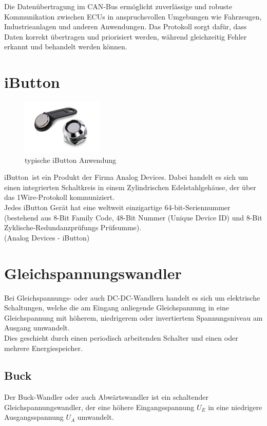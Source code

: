 Die Datenübertragung im \ac{CAN}-Bus ermöglicht zuverlässige und robuste Kommunikation zwischen \acp{ECU} in anspruchsvollen
Umgebungen wie Fahrzeugen, Industrieanlagen und anderen Anwendungen. Das Protokoll sorgt dafür, dass Daten korrekt
übertragen und priorisiert werden, während gleichzeitig Fehler erkannt und behandelt werden können.

\section{iButton\textregistered}

\begin{figure}
    \centering
    \includegraphics[width=0.35\textwidth]{resources/images/product-ibutton.jpg}
    \caption[iButton]{typische iButton Anwendung\cite{iButtonPic}}
    \label{fig:iButton}
\end{figure}

iButton\textregistered\ ist ein Produkt der Firma Analog Devices. Dabei handelt es sich um einen integrierten
Schaltkreis in einem Zylindrischen Edelstahlgehäuse, der über das 1Wire-Protokoll kommuniziert. \\
Jedes iButton Gerät hat eine weltweit einzigartige  64-bit-Seriennummer (bestehend aus 8-Bit Family Code,
48-Bit Nummer (Unique Device ID) und 8-Bit Zyklische-Redundanzprüfungs Prüfsumme).\\
(Analog Devices - iButton\cite{iButton})

\section{Gleichspannungswandler}

Bei Gleichspannungs- oder auch DC-DC-Wandlern handelt es sich um elektrische Schaltungen, welche die am Eingang
anliegende Gleichspannung in eine Gleichspannung mit höherem, niedrigerem oder invertiertem Spannungsniveau am
Ausgang umwandelt. \\
Dies geschieht durch einen periodisch arbeitenden Schalter und einen oder mehrere Energiespeicher.

\subsection{Buck}
Der Buck-Wandler oder auch Abwärtswandler ist ein schaltender Gleichspannungswandler, der eine höhere
Eingangsspannung \(U_E\) in eine niedrigere Ausgangsspannung \(U_A\) umwandelt.

